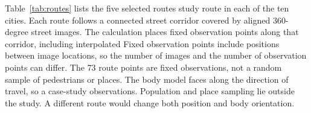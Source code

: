 \documentclass{IEEEoj} %
\providecommand{\DIFadd}[1]{{\protect\color{blue} \sf #1}} %
\providecommand{\DIFdel}[1]{{\protect\color{red} \scriptsize #1}} %
\providecommand{\DIFaddbegin}{} %
\providecommand{\DIFaddend}{} %
\providecommand{\DIFdelbegin}{} %
\providecommand{\DIFdelend}{} %
\begin{document}
Table~\ref{tab:routes} lists the \DIFdelbegin \DIFdel{five selected routes}\DIFdelend \DIFaddbegin \DIFadd{study route in each of the ten cities}\DIFaddend . Each
route follows a connected street corridor covered by aligned 360-degree street
images. \DIFdelbegin \DIFdel{The
calculation places fixed observation points along that corridor, including
interpolated }\DIFdelend \DIFaddbegin \DIFadd{Fixed observation points include }\DIFaddend positions between image locations, so
the number of images and \DIFdelbegin \DIFdel{the number of observation }\DIFdelend points can differ. The \DIFdelbegin \DIFdel{73 route }\DIFdelend \DIFaddbegin \DIFadd{163 }\DIFaddend points are fixed \DIFdelbegin \DIFdel{observations, not a random sample of pedestrians or places. The body model
faces along the direction of travel, so a }\DIFdelend \DIFaddbegin \DIFadd{case-study
observations. Population and place sampling lie outside the study. A }\DIFaddend different route
would change both position and \DIFaddbegin \DIFadd{body }\DIFaddend orientation.
\end{document}
